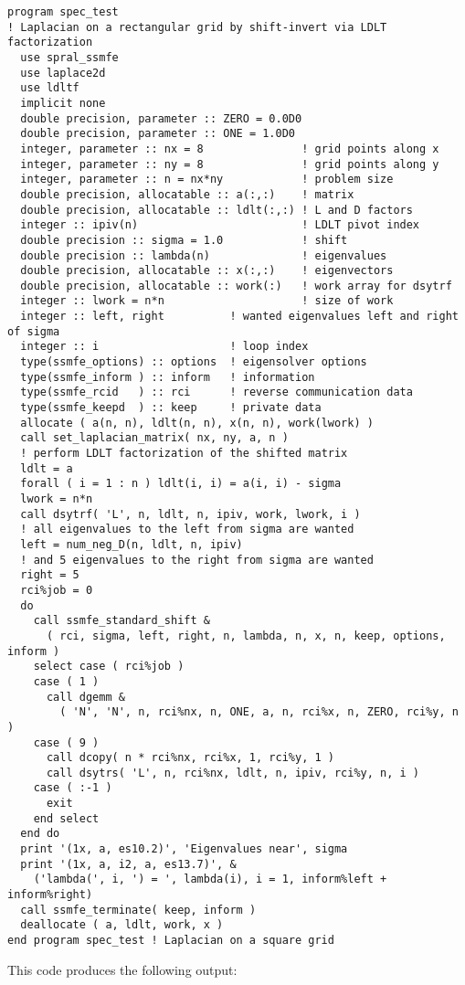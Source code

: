 \documentclass{spral}
\begin{document}
\begin{verbatim}
program spec_test 
! Laplacian on a rectangular grid by shift-invert via LDLT factorization
  use spral_ssmfe
  use laplace2d
  use ldltf
  implicit none
  double precision, parameter :: ZERO = 0.0D0
  double precision, parameter :: ONE = 1.0D0
  integer, parameter :: nx = 8               ! grid points along x
  integer, parameter :: ny = 8               ! grid points along y
  integer, parameter :: n = nx*ny            ! problem size
  double precision, allocatable :: a(:,:)    ! matrix
  double precision, allocatable :: ldlt(:,:) ! L and D factors
  integer :: ipiv(n)                         ! LDLT pivot index
  double precision :: sigma = 1.0            ! shift
  double precision :: lambda(n)              ! eigenvalues
  double precision, allocatable :: x(:,:)    ! eigenvectors
  double precision, allocatable :: work(:)   ! work array for dsytrf
  integer :: lwork = n*n                     ! size of work
  integer :: left, right          ! wanted eigenvalues left and right of sigma
  integer :: i                    ! loop index
  type(ssmfe_options) :: options  ! eigensolver options
  type(ssmfe_inform ) :: inform   ! information
  type(ssmfe_rcid   ) :: rci      ! reverse communication data
  type(ssmfe_keepd  ) :: keep     ! private data
  allocate ( a(n, n), ldlt(n, n), x(n, n), work(lwork) )
  call set_laplacian_matrix( nx, ny, a, n )
  ! perform LDLT factorization of the shifted matrix
  ldlt = a
  forall ( i = 1 : n ) ldlt(i, i) = a(i, i) - sigma
  lwork = n*n
  call dsytrf( 'L', n, ldlt, n, ipiv, work, lwork, i )
  ! all eigenvalues to the left from sigma are wanted
  left = num_neg_D(n, ldlt, n, ipiv)
  ! and 5 eigenvalues to the right from sigma are wanted
  right = 5
  rci%job = 0
  do
    call ssmfe_standard_shift &
      ( rci, sigma, left, right, n, lambda, n, x, n, keep, options, inform )
    select case ( rci%job )
    case ( 1 )
      call dgemm &
        ( 'N', 'N', n, rci%nx, n, ONE, a, n, rci%x, n, ZERO, rci%y, n )
    case ( 9 )
      call dcopy( n * rci%nx, rci%x, 1, rci%y, 1 )
      call dsytrs( 'L', n, rci%nx, ldlt, n, ipiv, rci%y, n, i )
    case ( :-1 )
      exit
    end select
  end do
  print '(1x, a, es10.2)', 'Eigenvalues near', sigma
  print '(1x, a, i2, a, es13.7)', &
    ('lambda(', i, ') = ', lambda(i), i = 1, inform%left + inform%right)
  call ssmfe_terminate( keep, inform )
  deallocate ( a, ldlt, work, x )
end program spec_test ! Laplacian on a square grid
\end{verbatim}

This code produces the following output:
\end{document}
